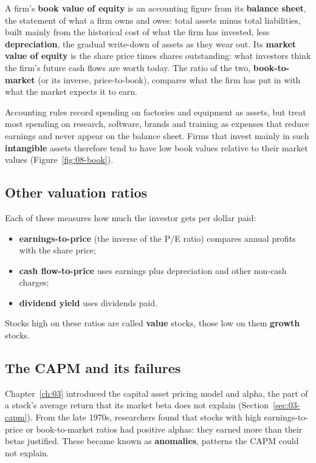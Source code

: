 A firm's \textbf{book value of equity} is an accounting figure from its \textbf{balance sheet}, the statement of what a firm owns and owes: total assets minus total liabilities, built mainly from the historical cost of what the firm has invested, less \textbf{depreciation}, the gradual write-down of assets as they wear out. Its \textbf{market value of equity} is the share price times shares outstanding: what investors think the firm's future cash flows are worth today. The ratio of the two, \textbf{book-to-market} (or its inverse, price-to-book), compares what the firm has put in with what the market expects it to earn.

Accounting rules record spending on factories and equipment as assets, but treat most spending on research, software, brands and training as expenses that reduce earnings and never appear on the balance sheet. Firms that invest mainly in such \textbf{intangible} assets therefore tend to have low book values relative to their market values (Figure~\ref{fig:08-book}).

\subsection{Other valuation ratios}

Each of these measures how much the investor gets per dollar paid:

\begin{itemize}
  \item \textbf{earnings-to-price} (the inverse of the P/E ratio) compares annual profits with the share price;
  \item \textbf{cash flow-to-price} uses earnings plus depreciation and other non-cash charges;
  \item \textbf{dividend yield} uses dividends paid.
\end{itemize}

Stocks high on these ratios are called \textbf{value} stocks, those low on them \textbf{growth} stocks.

\subsection{The CAPM and its failures}

Chapter~\ref{ch:03} introduced the capital asset pricing model and alpha, the part of a stock's average return that its market beta does not explain (Section~\ref{sec:03-capm}). From the late 1970s, researchers found that stocks with high earnings-to-price or book-to-market ratios had positive alphas: they earned more than their betas justified. These became known as \textbf{anomalies}, patterns the CAPM could not explain.

